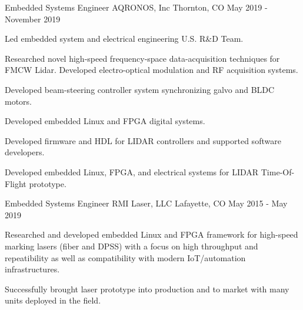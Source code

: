 

\begin{cventries}

  \cventry
    {Embedded Systems Engineer} %
    {AQRONOS, Inc} %
    {Thornton, CO} %
    {May 2019 - November 2019} %
    {
      \begin{cvitems} %
        \item {
			Led embedded system and electrical engineering U.S. R\&D Team.
        }
        \item {
			Researched novel high-speed frequency-space data-acquisition techniques for FMCW Lidar. Developed electro-optical modulation and RF acquisition systems.
        }
        \item {
			Developed beam-steering controller system synchronizing galvo and BLDC motors.
        }
		\item {
			Developed embedded Linux and FPGA digital systems.
		}
		\item {
			Developed firmware and HDL for LIDAR controllers and supported software developers.
		}
		\item {
			Developed embedded Linux, FPGA, and electrical systems for LIDAR Time-Of-Flight prototype.
		}
      \end{cvitems}
    }
  \cventry
    {Embedded Systems Engineer} %
    {RMI Laser, LLC} %
    {Lafayette, CO} %
    {May 2015 - May 2019} %
    {
      \begin{cvitems} %
        \item {
            Researched and developed embedded Linux and FPGA framework for high-speed
            marking lasers (fiber and DPSS) with a focus on high throughput and
            repeatibility as well as compatibility with modern IoT/automation infrastructures.
        }
        \item {
            Successfully brought laser prototype into production and to market with many
            units deployed in the field.
        }

\end{cvitems}}
\end{cventries}

